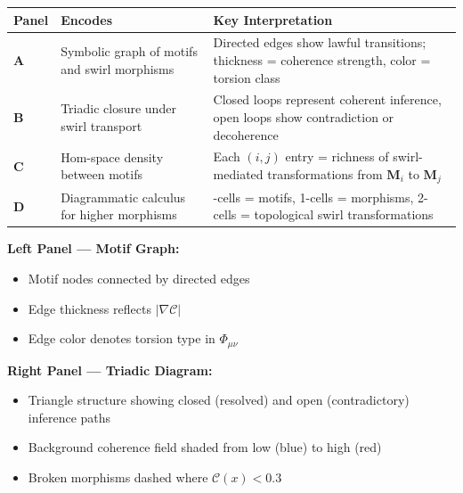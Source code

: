 \documentclass[
  11pt,
]{article}
\providecommand{\tightlist}{%
  \setlength{\itemsep}{0pt}\setlength{\parskip}{0pt}}
\begin{document}
\begin{longtable}[]{@{}
  >{\raggedright\arraybackslash}p{}
  >{\raggedright\arraybackslash}p{}
  >{\raggedright\arraybackslash}p{}@{}}
\toprule\noalign{}
\begin{minipage}[b]{\linewidth}\raggedright
Panel
\end{minipage} & \begin{minipage}[b]{\linewidth}\raggedright
Encodes
\end{minipage} & \begin{minipage}[b]{\linewidth}\raggedright
Key Interpretation
\end{minipage} \\
\midrule\noalign{}
\endhead
\bottomrule\noalign{}
\endlastfoot
\textbf{A} & Symbolic graph of motifs and swirl morphisms & Directed
edges show lawful transitions; thickness = coherence strength, color =
torsion class \\
\textbf{B} & Triadic closure under swirl transport & Closed loops
represent coherent inference, open loops show contradiction or
decoherence \\
\textbf{C} & Hom-space density between motifs & Each \((i,j)\) entry =
richness of swirl-mediated transformations from \(\mathbf{M}_i\) to
\(\mathbf{M}_j\) \\
\textbf{D} & Diagrammatic calculus for higher morphisms & 0-cells =
motifs, 1-cells = morphisms, 2-cells = topological swirl
transformations \\
\end{longtable}

\textbf{Left Panel --- Motif Graph:}

\begin{itemize}
\tightlist
\item
  Motif nodes connected by directed edges
\item
  Edge thickness reflects \(|\nabla \mathcal{C}|\)
\item
  Edge color denotes torsion type in \(\Phi_{\mu\nu}\)
\end{itemize}

\textbf{Right Panel --- Triadic Diagram:}

\begin{itemize}
\tightlist
\item
  Triangle structure showing closed (resolved) and open (contradictory)
  inference paths
\item
  Background coherence field shaded from low (blue) to high (red)
\item
  Broken morphisms dashed where \(\mathcal{C}(x) < 0.3\)
\end{itemize}
\end{document}
